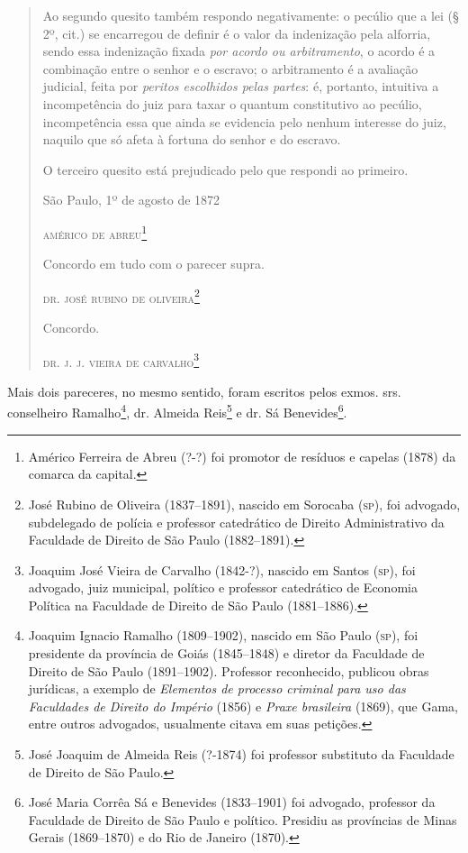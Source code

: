 \begin{quote}
Ao segundo quesito também respondo negativamente: o pecúlio que a lei (§
2º, cit.) se encarregou de definir é o valor da indenização pela
alforria, sendo essa indenização fixada \emph{por acordo ou
arbitramento}, o acordo é a combinação entre o senhor e o escravo; o
arbitramento é a avaliação judicial, feita por \emph{peritos escolhidos
pelas partes}: é, portanto, intuitiva a incompetência do juiz para taxar
o quantum constitutivo ao pecúlio, incompetência essa que ainda se
evidencia pelo nenhum interesse do juiz, naquilo que só afeta à fortuna
do senhor e do escravo.

O terceiro quesito está prejudicado pelo que respondi ao primeiro.

\begin{flushright}
São Paulo, 1º de agosto de 1872

\textsc{américo de abreu}\footnote{ Américo Ferreira de Abreu (?-?) foi promotor
  de resíduos e capelas (1878) da comarca da capital.}
\end{flushright}

Concordo em tudo com o parecer supra.

\begin{flushright}
\textsc{dr. josé rubino de oliveira}\footnote{ José Rubino de Oliveira
  (1837--1891), nascido em Sorocaba (\textsc{sp}), foi advogado, subdelegado de
  polícia e professor catedrático de Direito Administrativo da Faculdade
  de Direito de São Paulo (1882--1891).}
\end{flushright}

Concordo.

\begin{flushright}
\textsc{dr. j. j. vieira de carvalho}\footnote{ Joaquim José Vieira de Carvalho
  (1842-?), nascido em Santos (\textsc{sp}), foi advogado, juiz municipal,
  político e professor catedrático de Economia Política na Faculdade de
  Direito de São Paulo (1881--1886).}
\end{flushright}
\end{quote}

Mais dois pareceres, no mesmo sentido, foram escritos pelos exmos. srs.
conselheiro Ramalho\footnote{ Joaquim Ignacio Ramalho (1809--1902),
  nascido em São Paulo (\textsc{sp}), foi presidente da província de Goiás
  (1845--1848) e diretor da Faculdade de Direito de São Paulo
  (1891--1902). Professor reconhecido, publicou obras jurídicas, a
  exemplo de \emph{Elementos de processo criminal para uso das
  Faculdades de Direito do Império} (1856) e \emph{Praxe brasileira}
  (1869), que Gama, entre outros advogados, usualmente citava em suas
  petições.}, dr. Almeida Reis\footnote{ José Joaquim de Almeida Reis
  (?-1874) foi professor substituto da Faculdade de Direito de São
  Paulo.} e dr. Sá Benevides\footnote{ José Maria Corrêa Sá e Benevides
  (1833--1901) foi advogado, professor da Faculdade de Direito de São
  Paulo e político. Presidiu as províncias de Minas Gerais (1869--1870) e
  do Rio de Janeiro (1870).}.

